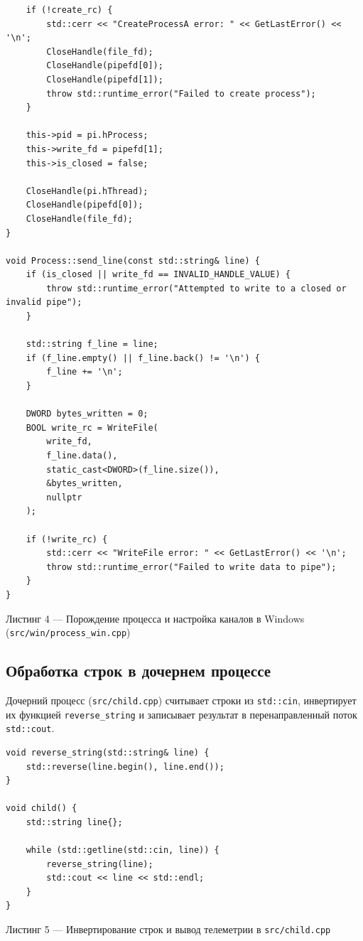 \documentclass[11pt, a4paper]{article}
\begin{document}
\begin{lstlisting}
    if (!create_rc) {
        std::cerr << "CreateProcessA error: " << GetLastError() << '\n';
        CloseHandle(file_fd);
        CloseHandle(pipefd[0]);
        CloseHandle(pipefd[1]);
        throw std::runtime_error("Failed to create process");
    }

    this->pid = pi.hProcess;
    this->write_fd = pipefd[1];
    this->is_closed = false;

    CloseHandle(pi.hThread);
    CloseHandle(pipefd[0]);
    CloseHandle(file_fd);
}

void Process::send_line(const std::string& line) {
    if (is_closed || write_fd == INVALID_HANDLE_VALUE) {
        throw std::runtime_error("Attempted to write to a closed or invalid pipe");
    }

    std::string f_line = line;
    if (f_line.empty() || f_line.back() != '\n') {
        f_line += '\n';
    }

    DWORD bytes_written = 0;
    BOOL write_rc = WriteFile(
        write_fd,
        f_line.data(),
        static_cast<DWORD>(f_line.size()),
        &bytes_written,
        nullptr
    );

    if (!write_rc) {
        std::cerr << "WriteFile error: " << GetLastError() << '\n';
        throw std::runtime_error("Failed to write data to pipe");
    }
}

\end{lstlisting}
\begin{center}
    \small Листинг 4 — Порождение процесса и настройка каналов в Windows (\texttt{src/win/process\_win.cpp})
\end{center}

\subsection{Обработка строк в дочернем процессе}
Дочерний процесс (\texttt{src/child.cpp}) считывает строки из \texttt{std::cin}, инвертирует их функцией \texttt{reverse\_string} и записывает результат в перенаправленный поток \texttt{std::cout}.

\begin{lstlisting}
void reverse_string(std::string& line) {
    std::reverse(line.begin(), line.end());
}

void child() {
    std::string line{};

    while (std::getline(std::cin, line)) {
        reverse_string(line);
        std::cout << line << std::endl;
    }
}
\end{lstlisting}
\begin{center}
    \small Листинг 5 — Инвертирование строк и вывод телеметрии в \texttt{src/child.cpp}
\end{center}
\end{document}
